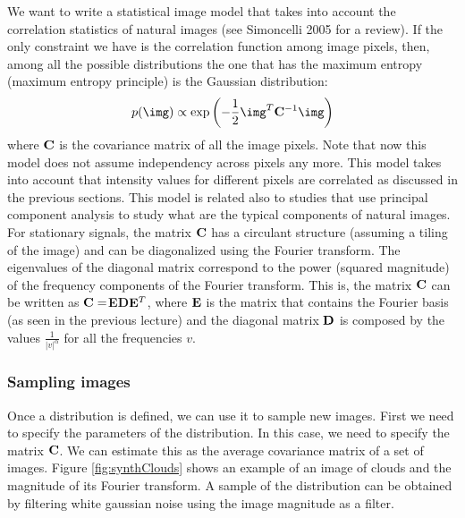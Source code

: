 We want to write a statistical image model that takes into account the correlation statistics of natural images (see Simoncelli 2005 for a review). If the only constraint we have is the correlation function among image pixels, then, among all the possible distributions the one that has the maximum entropy (maximum entropy principle) is the Gaussian distribution: 
\begin{equation}
p(\img) \propto \exp \left(-\frac{1}{2} \img^T {\bf C}^{-1} \img \right)
\label{eq:gaussianmodel}
\end{equation}
where ${\bf C}$ is the covariance matrix of all the image pixels. Note that now this model does not assume independency across pixels any more. This model takes into account that intensity values for different pixels are correlated as discussed in the previous sections. This model is related also to studies that use principal component analysis to study what are the typical components of natural images. For stationary signals, the matrix ${\bf C}$ has a circulant structure (assuming a tiling of the image) and can be diagonalized using the Fourier transform. The eigenvalues of the diagonal matrix correspond to the power (squared magnitude) of the frequency components of the Fourier transform. This is, the matrix ${\bf C}$ can be written as ${\bf C} = ${\bf E}{\bf D}${\bf E}^T$, where ${\bf E}$ is the matrix that contains the Fourier basis (as seen in the previous lecture) and the diagonal matrix ${\bf D}$ is composed by the values $\frac{1}{| v | ^ \alpha}$ for all the frequencies $v$.


%


\subsubsection{Sampling images}

Once a distribution is defined, we can use it to sample new images. First we need to specify the parameters of the distribution. In this case, we need to specify the matrix ${\bf C}$. We can estimate this as the average covariance matrix of a set of images. Figure \ref{fig:synthClouds} shows an example of an image of clouds and the magnitude of its Fourier transform. A sample of the distribution can be obtained by filtering white gaussian noise using the image magnitude as a filter. 

